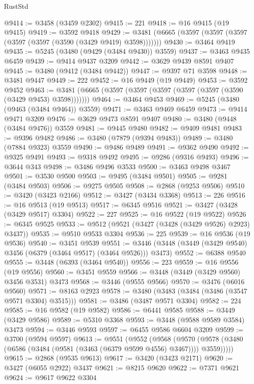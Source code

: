 \begin{lexlean}{RustStd}
\begin{coremodule}
{\begin{coremodule}
{{{{{{{{{{{{{{{{{{{{{{{{{{{{{{{{{{{{{{{{{{{{{{{{{{{{{{{{{{{{{{{{{{{{{{{{{{{{{{{{{{{{{@9414 := @3458 (@3459 @2302)
@9415 := 221
@9418 := @16 @9415 (@19 @9415)
@9419 := @3592 @9418
@9429 := @3481 (@6665 (@3597 (@3597 (@3597 (@3597 (@3597 (@3590 (@3429 @9419) @3598)))))))
@9430 := @3464 @9419
@9435 := @5245 (@3480 (@9429 (@3484 @9430)) @3559)
@9437 := @3463 @9435 @6459
@9439 := @9414 @9437 @3209
@9442 := @3629 @9439 @8591 @9407
@9445 := @3480 (@9412 (@3484 @9442))
@9447 := @9397 @71 @3598
@9448 := @3481 @9447
@9449 := 222
@9452 := @16 @9449 (@19 @9449)
@9453 := @3592 @9452
@9463 := @3481 (@6665 (@3597 (@3597 (@3597 (@3597 (@3597 (@3590 (@3429 @9453) @3598)))))))
@9464 := @3464 @9453
@9469 := @5245 (@3480 (@9463 (@3484 @9464)) @3559)
@9471 := @3463 @9469 @6459
@9473 := @9414 @9471 @3209
@9476 := @3629 @9473 @8591 @9407
@9480 := @3480 (@9448 (@3484 @9476)) @3559
@9481 := @9445 @9480
@9482 := @9409 @9481
@9483 := @9396 @9482
@9486 := @3480 (@7879 (@9394 @9483))
@9489 := @3480 (@7884 @9323) @3559
@9490 := @9486 @9489
@9491 := @9362 @9490
@9492 := @9325 @9491
@9493 := @9318 @9492
@9495 := @9286 (@9316 @9493)
@9496 := @3644 @343
@9498 := @3486 @9496 @3533
@9500 := @3463 @9498 @3467
@9501 := @3530 @9500
@9503 := @9495 (@3484 @9501)
@9505 := @9281 (@3484 @9503)
@9506 := @9275 @9505
@9508 := @2868 (@9253 @9506)
@9510 := @3420 (@3423 @2166)
@9512 := @3427 (@3434 @3368)
@9513 := 226
@9516 := @16 @9513 (@19 @9513)
@9517 := @6345 @9516
@9521 := @3427 (@3428 (@3429 @9517) @3304)
@9522 := 227
@9525 := @16 @9522 (@19 @9522)
@9526 := @6345 @9525
@9533 := @9512 (@9521 (@3427 (@3428 (@3429 @9526) @2923) @3437))
@9535 := @9510 @9533 @3304
@9536 := 225
@9539 := @16 @9536 (@19 @9536)
@9540 := @3451 @9539
@9551 := @3446 (@3448 (@3449 (@3429 @9540) @3456 (@6379 (@3464 @9517) (@3464 @9526))) @3473)
@9552 := @6388 @9540
@9555 := @3448 (@6393 (@3464 @9540))
@9556 := 223
@9559 := @16 @9556 (@19 @9556)
@9560 := @3451 @9559
@9566 := @3448 (@3449 (@3429 @9560) @3456 @3531) @3473
@9568 := @3446 (@9555 @9566)
@9570 := @3476 (@6016 @9560)
@9571 := @8163 @2923
@9578 := @3480 (@3483 (@3484 (@3486 (@3547 @9571 @3304) @3515)))
@9581 := @3486 (@3487 @9571 @3304)
@9582 := 224
@9585 := @16 @9582 (@19 @9582)
@9586 := @6441 @9585
@9588 := @3449 (@3429 @9586)
@9589 := @5310 @3368
@9593 := @3448 (@9588 @9589 @3584) @3473
@9594 := @3446 @9593
@9597 := @6455 @9586 @6604 @3209
@9599 := @3700 (@9594 @9597)
@9613 := @9551
    (@9552
      (@9568
        (@9570 (@9578 (@3480 (@6586 (@3484 (@9581 (@3463 (@6379 @9599 @4556) @3467)))) @3559)))))
@9615 := @2868 (@9535 @9613)
@9617 := @3420 (@3423 @2171)
@9620 := @3427 (@6055 @2922) @3437
@9621 := @8215 @9620
@9622 := @7371 @9621
@9624 := @9617 @9622 @3304
}}}}}}}}}}}}}}}}}}}}}}}}}}}}}}}}}}}}}}}}}}}}}}}}}}}}}}}}}}}}}}}}}}}}}}}}}}}}}}}}}}}}}
\end{coremodule}}
\end{coremodule}
\end{lexlean}
